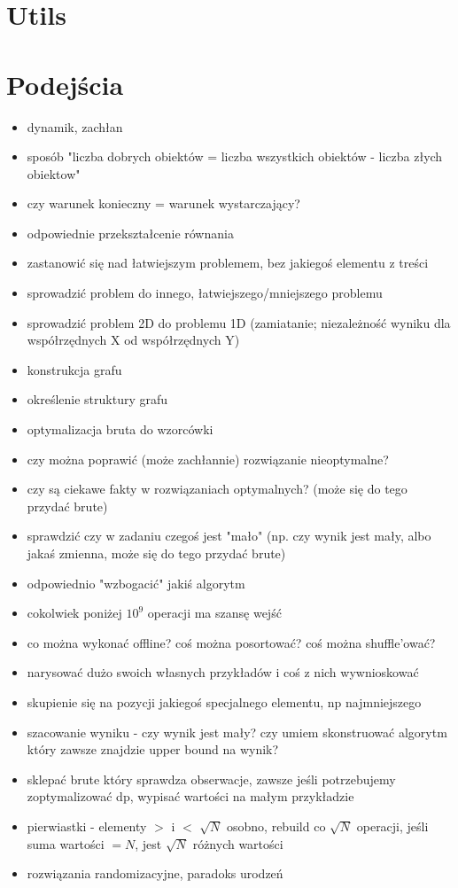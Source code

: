 \chapter{Utils}


\chapter{Podejścia}

\begin{itemize}[noitemsep]
	\item dynamik, zachłan
	\item sposób "liczba dobrych obiektów = liczba wszystkich obiektów - liczba złych obiektow"
	\item czy warunek konieczny = warunek wystarczający?
	\item odpowiednie przekształcenie równania
	\item zastanowić się nad łatwiejszym problemem, bez jakiegoś elementu z treści
	\item sprowadzić problem do innego, łatwiejszego/mniejszego problemu
	\item sprowadzić problem 2D do problemu 1D (zamiatanie; niezależność wyniku dla współrzędnych X od współrzędnych Y)
	\item konstrukcja grafu
	\item określenie struktury grafu
	\item optymalizacja bruta do wzorcówki
	\item czy można poprawić (może zachłannie) rozwiązanie nieoptymalne?
	\item czy są ciekawe fakty w rozwiązaniach optymalnych? (może się do tego przydać brute)
	\item sprawdzić czy w zadaniu czegoś jest "mało" (np. czy wynik jest mały, albo jakaś zmienna, może się do tego przydać brute)
	\item odpowiednio "wzbogacić" jakiś algorytm
	\item cokolwiek poniżej $10^9$ operacji ma szansę wejść
	\item co można wykonać offline? coś można posortować? coś można shuffle'ować?
	\item narysować dużo swoich własnych przykładów i coś z nich wywnioskować
	\item skupienie się na pozycji jakiegoś specjalnego elementu, np najmniejszego
	\item szacowanie wyniku - czy wynik jest mały? czy umiem skonstruować algorytm który zawsze znajdzie upper bound na wynik?
	\item sklepać brute który sprawdza obserwacje, zawsze jeśli potrzebujemy zoptymalizować dp, wypisać wartości na małym przykładzie
	\item pierwiastki - elementy $>$ i $<$ $\sqrt{N}$ osobno, rebuild co $\sqrt{N}$ operacji, jeśli suma wartości $=N$, jest $\sqrt{N}$ różnych wartości
	\item rozwiązania randomizacyjne, paradoks urodzeń
\end{itemize}
